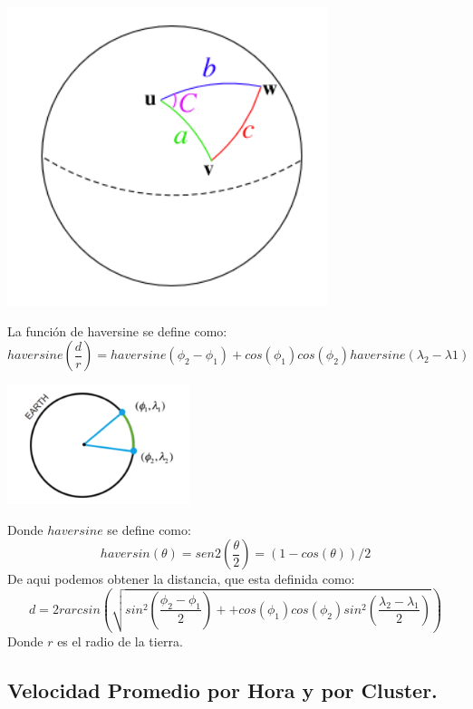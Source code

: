 \documentclass[a4paper]{article}
\begin{document}
\begin{center}
\includegraphics[width=0.7\textwidth]{haversine.png}
\end{center}
La funci\'on de haversine se define como:
\begin{displaymath}
haversine\left(\frac{d}{r}\right)=haversine\left(\phi_{2} - \phi_{1} \right) + cos(\phi_{1})cos(\phi_{2})haversine\left(\lambda_{2}-\lambda{1}\right)
\end{displaymath}
\begin{center}
\includegraphics[width=0.4\textwidth]{haverseno.png}
\end{center}
Donde $haversine$ se define como:
\begin{displaymath}
haversin (\theta) = sen 2 (\frac{\theta}{2}) = (1-cos ( \theta ))/2
\end{displaymath}
De aqui podemos obtener la distancia, que esta definida como:
\begin{displaymath}
d=2rarcsin\left(\sqrt{sin^{2}\left(\frac{\phi_{2} - \phi_{1} }{2}\right)+ + cos(\phi_{1})cos(\phi_{2})sin^{2}\left(\frac{\lambda_{2} - \lambda_{1} }{2}\right)} \right)
\end{displaymath}
Donde $r$ es el radio de la tierra.
\subsection{Velocidad Promedio por Hora y por Cluster.}
\end{document}
